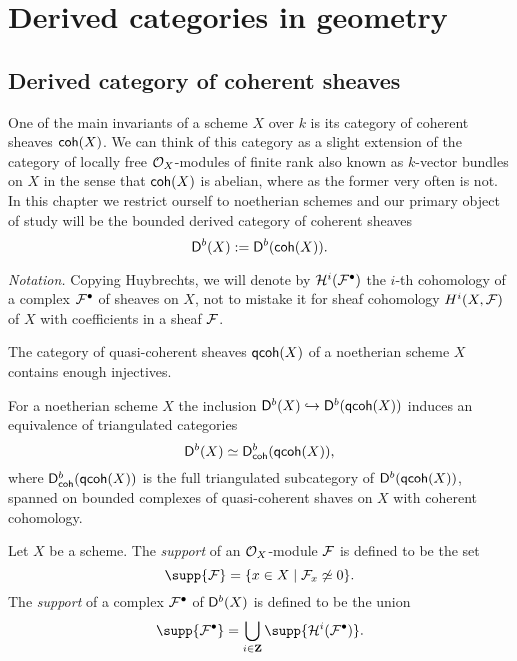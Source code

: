 \section{Derived categories in geometry}
\label{Derived categories in geometry}

\subsection{Derived category of coherent sheaves}
\label{Subsection: Derived category of coherent sheaves}

One of the main invariants of a scheme $X$ over $k$ is its category of coherent sheaves $\mathsf{coh}(X)$. We can think of this category as a slight extension of the category of locally free $\mathcal O_X$-modules of finite rank also known as $k$-vector bundles on $X$ in the sense that $\mathsf{coh}(X)$ is abelian, where as the former very often is not. In this chapter we restrict ourself to noetherian schemes and our primary object of study will be the bounded derived category of coherent sheaves
\[
    \mathsf{D}^b(X) := \mathsf{D}^b(\mathsf{coh}(X)).
\]

\noindent
\textsl{Notation.}
Copying Huybrechts, we will denote by $\mathcal H^i(\mathcal F^\bullet)$ the $i$-th cohomology of a complex $\mathcal F^\bullet$ of sheaves on $X$, not to mistake it for sheaf cohomology $H^{i}(X, \mathcal F)$ of $X$ with coefficients in a sheaf $\mathcal F$.

\begin{proposition}
    The category of quasi-coherent sheaves $\mathsf{qcoh}(X)$ of a noetherian scheme $X$ contains enough injectives.
\end{proposition}

\begin{proposition}
    For a noetherian scheme $X$ the inclusion $\mathsf{D}^b(X) \hookrightarrow \mathsf{D}^b(\mathsf{qcoh}(X))$ induces an equivalence of triangulated categories
    \[
        \mathsf{D}^b(X) \simeq \mathsf{D}^b_{\mathsf{coh}}(\mathsf{qcoh}(X)),
    \]
    where $\mathsf{D}^b_{\mathsf{coh}}(\mathsf{qcoh}(X))$ is the full triangulated subcategory of $\mathsf{D}^b(\mathsf{qcoh}(X))$, spanned on bounded complexes of quasi-coherent shaves on $X$ with coherent cohomology.
\end{proposition}

\begin{definition}
    \label{Definition of support}
    Let $X$ be a scheme. The \emph{support} of an $\mathcal{O}_{X}$-module $\mathcal F$ is defined to be the set
    \[
        \supp{\F} = \{x \in X \mid \F_x \not\iso 0 \}.
    \] 
    The \emph{support} of a complex $\mathcal F^\bullet$ of $\mathsf{D}^b(X)$ is defined to be the union
    \[
        \supp{\F^\bullet} = \bigcup_{i \in \Z} \supp{\mathcal H^i(\F^\bullet)}.
    \]
\end{definition}

